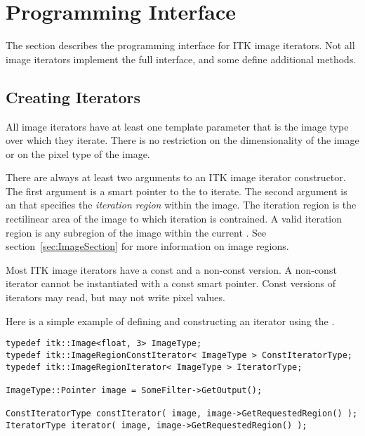 \section{Programming Interface}
\label{sec:IteratorsInterface}

The section describes the programming interface for ITK image iterators.  Not
all image iterators implement the full interface, and some define additional
methods.

\subsection{Creating Iterators}
\label{sec:CreatingIterators}

All image iterators have at least one template parameter that is the image type over
which they iterate.  There is no restriction on the dimensionality of the image
or on the pixel type of the image.


There are always at least two arguments to an ITK image iterator constructor.
The first argument is a smart pointer to the  to iterate. The
second argument is an  that specifies the \emph{iteration
region} within the image.  The iteration region is the rectilinear area of the
image to which iteration is contrained. A valid iteration region is any
subregion of the image within the current .  See
section~\ref{sec:ImageSection} for more information on image regions. 

Most ITK image iterators have a const and a non-const version.  A non-const
iterator cannot be instantiated with a const  smart pointer.
Const versions of iterators may read, but may not write pixel values.

Here is a simple example of defining and constructing an iterator using the
.  

\small
\begin{verbatim}
typedef itk::Image<float, 3> ImageType;
typedef itk::ImageRegionConstIterator< ImageType > ConstIteratorType;
typedef itk::ImageRegionIterator< ImageType > IteratorType;

ImageType::Pointer image = SomeFilter->GetOutput();

ConstIteratorType constIterator( image, image->GetRequestedRegion() );
IteratorType iterator( image, image->GetRequestedRegion() );
\end{verbatim}
\normalsize

